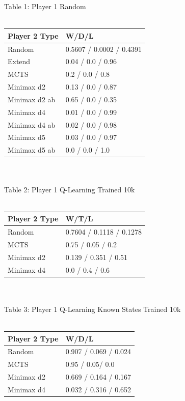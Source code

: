 \documentclass[12pt]{article}
\begin{document}
Table 1: Player 1 Random\\\\
\begin{tabular}{l | l}
Player 2 Type & W/D/L                    \\ \hline
Random        & 0.5607 / 0.0002 / 0.4391 \\
Extend        & 0.04 / 0.0 / 0.96        \\
MCTS          & 0.2 / 0.0 / 0.8          \\
Minimax d2    & 0.13 / 0.0 / 0.87        \\
Minimax d2 ab & 0.65 / 0.0 / 0.35        \\
Minimax d4    & 0.01 / 0.0 / 0.99        \\
Minimax d4 ab & 0.02 / 0.0 / 0.98        \\
Minimax d5    & 0.03 / 0.0 / 0.97        \\
Minimax d5 ab &  0.0 / 0.0 / 1.0     \\                  
\end{tabular}\\\\
Table 2: Player 1 Q-Learning Trained 10k\\\\
\begin{tabular}{l|l}
Player 2 Type               & W/T/L                                     \\ \hline
Random     & 0.7604 / 0.1118 / 0.1278 \\
MCTS                        & 0.75 / 0.05 / 0.2  \\
Minimax d2 & 0.139 / 0.351 / 0.51     \\
Minimax d4 & 0.0 / 0.4 / 0.6
\end{tabular}\\\\
Table 3: Player 1 Q-Learning Known States Trained 10k\\\\
\begin{tabular}{l|l}
Player 2 Type & W/D/L                    \\ \hline
Random        & 0.907 / 0.069 / 0.024 \\
MCTS & 0.95 / 0.05/ 0.0\\
Minimax d2    & 0.669 / 0.164 / 0.167    \\
Minimax d4    &  0.032 / 0.316 / 0.652                       
\end{tabular}\\\\
\end{document}
